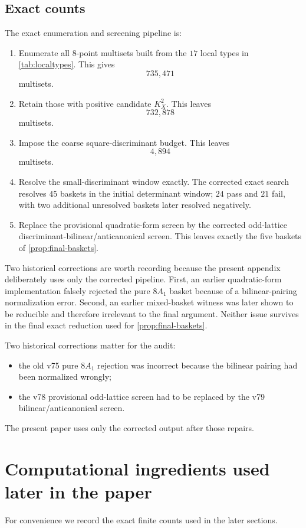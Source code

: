 \documentclass[11pt]{article}
\theoremstyle{definition}
\begin{document}
\subsection{Exact counts}
The exact enumeration and screening pipeline is:
\begin{enumerate}[label=\textup{(\arabic*)}]
\item Enumerate all $8$-point multisets built from the $17$ local types in \cref{tab:localtypes}. This gives
\[
735{,}471
\]
multisets.
\item Retain those with positive candidate $K_X^2$. This leaves
\[
732{,}878
\]
multisets.
\item Impose the coarse square-discriminant budget. This leaves
\[
4{,}894
\]
multisets.
\item Resolve the small-discriminant window exactly. The corrected exact search resolves $45$ baskets in the initial determinant window; $24$ pass and $21$ fail, with two additional unresolved baskets later resolved negatively.
\item Replace the provisional quadratic-form screen by the corrected odd-lattice discriminant-bilinear/anticanonical screen. This leaves exactly the five baskets of \cref{prop:final-baskets}.
\end{enumerate}

Two historical corrections are worth recording because the present appendix deliberately uses only the corrected pipeline. First, an earlier quadratic-form implementation falsely rejected the pure $8A_1$ basket because of a bilinear-pairing normalization error. Second, an earlier mixed-basket witness was later shown to be reducible and therefore irrelevant to the final argument. Neither issue survives in the final exact reduction used for \cref{prop:final-baskets}.

Two historical corrections matter for the audit:
\begin{itemize}
\item the old v75 pure $8A_1$ rejection was incorrect because the bilinear pairing had been normalized wrongly;
\item the v78 provisional odd-lattice screen had to be replaced by the v79 bilinear/anticanonical screen.
\end{itemize}
The present paper uses only the corrected output after those repairs.

\section{Computational ingredients used later in the paper}\label{app:later-computations}
For convenience we record the exact finite counts used in the later sections.
\end{document}
